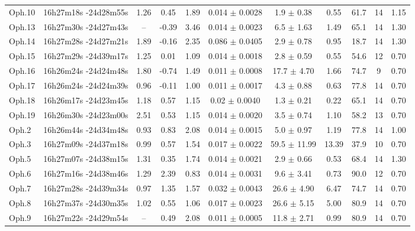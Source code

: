 \begin{landscape}
\begin{table}[!h]
\begin{center}
\begin{longtable}{lcccccccccc}
Oph.10	&	16h27m18s -24d28m55s	&	1.26	&	0.45	&	1.89	&	0.014	$\pm$	0.0028	&	1.9	$\pm$	0.38	&	0.55	&	61.7	&	14	&	1.15	\\
Oph.13	&	16h27m30s -24d27m43s	&	--	&	-0.39	&	3.46	&	0.014	$\pm$	0.0023	&	6.5	$\pm$	1.63	&	1.49	&	65.1	&	14	&	1.30	\\
Oph.14	&	16h27m28s -24d27m21s	&	1.89	&	-0.16	&	2.35	&	0.086	$\pm$	0.0405	&	2.9	$\pm$	0.78	&	0.95	&	18.7	&	14	&	1.30	\\
Oph.15	&	16h27m29s -24d39m17s	&	1.25	&	0.01	&	1.09	&	0.014	$\pm$	0.0018	&	2.8	$\pm$	0.59	&	0.55	&	54.6	&	12	&	0.70	\\
Oph.16	&	16h26m24s -24d24m48s	&	1.80	&	-0.74	&	1.49	&	0.011	$\pm$	0.0008	&	17.7	$\pm$	4.70	&	1.66	&	74.7	&	9	&	0.70	\\
Oph.17	&	16h26m24s -24d24m39s	&	0.96	&	-0.11	&	1.00	&	0.011	$\pm$	0.0017	&	4.3	$\pm$	0.88	&	0.63	&	77.8	&	14	&	0.70	\\
Oph.18	&	16h26m17s -24d23m45s	&	1.18	&	0.57	&	1.15	&	0.02	$\pm$	0.0040	&	1.3	$\pm$	0.21	&	0.22	&	65.1	&	14	&	0.70	\\
Oph.19	&	16h26m30s -24d23m00s	&	2.51	&	0.53	&	1.15	&	0.014	$\pm$	0.0020	&	3.5	$\pm$	0.74	&	1.10	&	58.2	&	13	&	0.70	\\
Oph.2	&	16h26m44s -24d34m48s	&	0.93	&	0.83	&	2.08	&	0.014	$\pm$	0.0015	&	5.0	$\pm$	0.97	&	1.19	&	77.8	&	14	&	1.00	\\
Oph.3	&	16h27m09s -24d37m18s	&	0.99	&	0.57	&	1.54	&	0.017	$\pm$	0.0022	&	59.5	$\pm$	11.99	&	13.39	&	37.9	&	10	&	0.70	\\
Oph.5	&	16h27m07s -24d38m15s	&	1.31	&	0.35	&	1.74	&	0.014	$\pm$	0.0021	&	2.9	$\pm$	0.66	&	0.53	&	68.4	&	14	&	1.30	\\
Oph.6	&	16h27m16s -24d38m46s	&	1.29	&	2.39	&	0.83	&	0.014	$\pm$	0.0031	&	9.6	$\pm$	3.41	&	0.73	&	90.0	&	12	&	0.70	\\
Oph.7	&	16h27m28s -24d39m34s	&	0.97	&	1.35	&	1.57	&	0.032	$\pm$	0.0043	&	26.6	$\pm$	4.90	&	6.47	&	74.7	&	14	&	0.70	\\
Oph.8	&	16h27m37s -24d30m35s	&	1.02	&	0.55	&	1.06	&	0.017	$\pm$	0.0023	&	26.6	$\pm$	5.15	&	5.00	&	80.9	&	14	&	0.70	\\
Oph.9	&	16h27m22s -24d29m54s	&	--	&	0.49	&	2.08	&	0.011	$\pm$	0.0005	&	11.8	$\pm$	2.71	&	0.99	&	80.9	&	14	&	0.70	\\
\bottomrule																																															
\end{longtable}																																	
\end{center}																						
\end{table}	
\end{landscape}			


